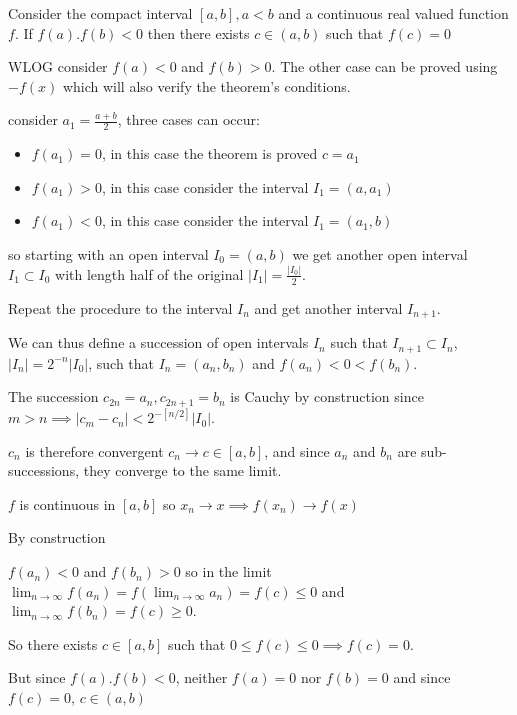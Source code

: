 \documentclass[12pt]{article}
\begin{document}
Consider the compact interval $[a,b], a<b$ and a continuous real valued function $f$. If $f(a).f(b)<0$ then there exists $c\in(a,b)$ such that $f(c)=0$

WLOG consider $f(a)<0$ and $f(b)>0$. The other case can be proved using $-f(x)$ which will also verify the theorem's conditions.

consider $a_1 = \frac{a+b}{2}$, three cases can occur:

\begin{itemize}
\item $f(a_1)=0$, in this case the theorem is proved $c=a_1$
\item $f(a_1)>0$, in this case consider the interval $I_1 = (a,a_1)$
\item $f(a_1)<0$, in this case consider the interval $I_1 = (a_1,b)$
\end{itemize}

so starting with an open interval $I_0 = (a,b)$ we get another open interval $I_1 \subset I_0$ with length half of the original $|I_1| = \frac{|I_0|}{2}$.

Repeat the procedure to the interval $I_n$ and get another interval $I_{n+1}$.

We can thus define a succession of open intervals $I_n$ such that $I_{n+1} \subset I_n$, $|I_n|=2^{-n}|I_0|$, such that $I_n = (a_n,b_n)$ and $f(a_n)<0<f(b_n)$.

The succession $c_{2n} = a_n, c_{2n+1}=b_n$ is Cauchy by construction since $m>n \implies |c_m-c_n|<2^{-[n/2]}|I_0|$.

$c_n$ is therefore convergent $c_n\to c\in [a,b]$, and since $a_n$ and $b_n$ are sub-successions, they converge to the same limit. 

$f$ is continuous in $[a,b]$ so $x_n \to x \implies f(x_n) \to f(x)$

By construction

$f(a_n)<0$ and $f(b_n)>0$ so in the limit $\lim_{n \to \infty} f(a_n) = f(\lim_{n \to \infty} a_n)= f(c)\le 0$ and $\lim_{n \to \infty} f(b_n) = f(c) \ge 0$.

So there exists $c \in [a,b]$ such that $0 \le f(c) \le 0 \implies f(c)=0$.

But since $f(a).f(b)<0$, neither $f(a)=0$ nor $f(b)=0$ and since $f(c)=0$, $c \in (a,b)$
\end{document}
